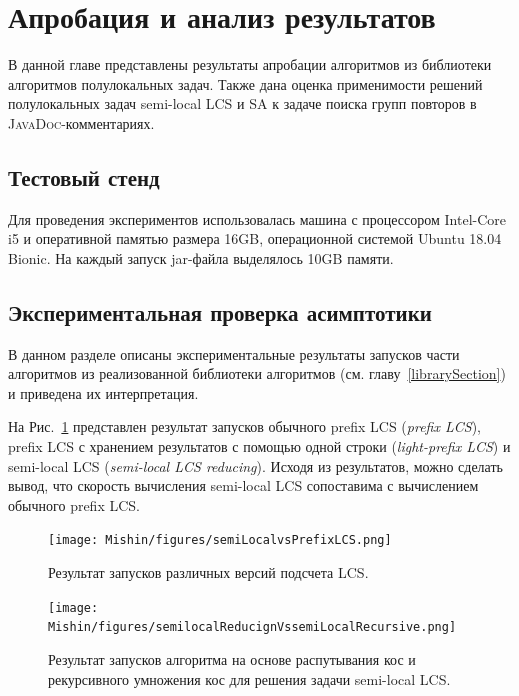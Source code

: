 \section{Апробация и анализ результатов}\label{appob}
В данной главе представлены результаты апробации алгоритмов из библиотеки алгоритмов полулокальных задач.
Также дана оценка применимости решений полулокальных задач {semi-local LCS} и {SA} к задаче поиска групп повторов в \textsc{JavaDoc}-комментариях.


\subsection{Тестовый стенд}

Для проведения экспериментов использовалась машина с процессором Intel-Core i5 и оперативной памятью размера 16GB, операционной системой Ubuntu 18.04 Bionic.
На каждый запуск jar-файла выделялось 10GB памяти.

\subsection{Экспериментальная проверка асимптотики}

В данном разделе описаны экспериментальные результаты запусков части алгоритмов из реализованной библиотеки алгоритмов (см. главу~\ref{librarySection}) и приведена их интерпретация.

На Рис.~\ref{fig:speedlcs} представлен результат запусков обычного {prefix LCS} (\emph{prefix LCS}), {prefix LCS} с хранением результатов с помощью одной строки (\emph{light-prefix LCS}) и {semi-local LCS} (\emph{semi-local LCS reducing}).
Исходя из результатов, можно сделать вывод, что скорость вычисления {semi-local LCS} сопоставима с вычислением обычного {prefix LCS}.

\begin{figure}[t!]
\centering
    \texttt{[image: Mishin/figures/semiLocalvsPrefixLCS.png]}
    \caption{Результат запусков различных версий подсчета {LCS}.}\label{fig:speedlcs}
\end{figure}

\begin{figure}[t!]
\centering
    \texttt{[image: Mishin/figures/semilocalReducignVssemiLocalRecursive.png]}
    \caption{Результат запусков алгоритма на основе распутывания кос и рекурсивного умножения кос для решения задачи {semi-local LCS}.}\label{fig:speedlcs2}
\end{figure}

